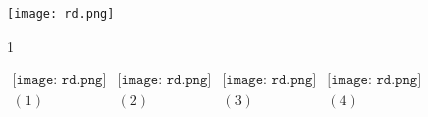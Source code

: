 \lipsum[1-4]
\begin{figure}
\centering
\texttt{[image: rd.png]}
\caption{1}
\end{figure}
\lipsum[1-6]


\begin{figure}[h]
\begin{center}$
\begin{array}{cccc}
\texttt{[image: rd.png]}&
\texttt{[image: rd.png]}&
\texttt{[image: rd.png]}&
\texttt{[image: rd.png]}\\
(1) & (2) & (3) & (4)
\end{array}$
\end{center}
\end{figure}
